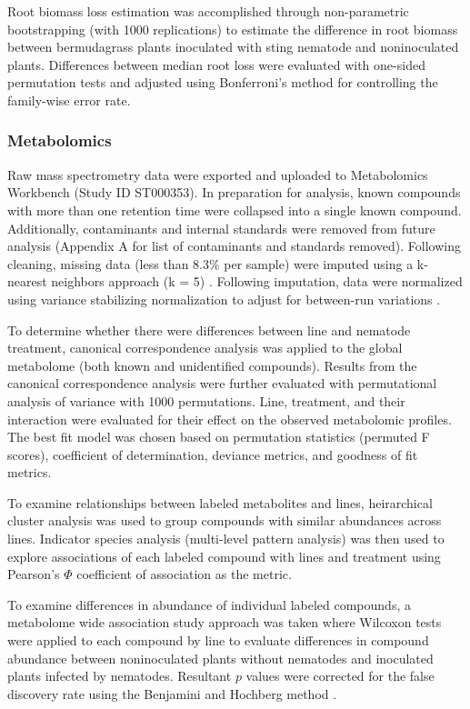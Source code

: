 \documentclass[9pt,lineno]{elife}
\begin{document}
Root biomass loss estimation was accomplished through non-parametric bootstrapping (with 1000 replications) to estimate the difference in root biomass between bermudagrass plants inoculated with sting nematode and noninoculated plants.  Differences between median root loss were evaluated with one-sided permutation tests and adjusted using Bonferroni's method for controlling the family-wise error rate.


\subsubsection{Metabolomics}

Raw mass spectrometry data were exported and uploaded to Metabolomics Workbench (Study ID ST000353).  In preparation for analysis, known compounds with more than one retention time were collapsed into a single known compound.  Additionally, contaminants and internal standards were removed from future analysis (Appendix A for list of contaminants and standards removed).  Following cleaning, missing data (less than 8.3\% per sample) were imputed using a k-nearest neighbors approach (k = 5) \citep{armitage2015missing}.  Following imputation, data were normalized using variance stabilizing normalization to adjust for between-run variations \citep{li2016performance}.  

To determine whether there were differences between line and nematode treatment, canonical correspondence analysis was applied to the global metabolome (both known and unidentified compounds).  Results from the canonical correspondence analysis were further evaluated with permutational analysis of variance with 1000 permutations. Line, treatment, and their interaction were evaluated for their effect on the observed metabolomic profiles.  The best fit model was chosen based on permutation statistics (permuted F scores), coefficient of determination, deviance metrics, and goodness of fit metrics.  

To examine relationships between labeled metabolites and lines, heirarchical cluster analysis was used to group compounds with similar abundances across lines.  Indicator species analysis (multi-level pattern analysis) was then used to explore associations of each labeled compound with lines and treatment using Pearson's $\Phi$ coefficient of association as the metric. 

To examine differences in abundance of individual labeled compounds, a metabolome wide association study approach was taken where Wilcoxon tests were applied to each compound by line to evaluate differences in compound abundance between noninoculated plants without nematodes and inoculated plants infected by nematodes.  Resultant $p$ values were corrected for the false discovery rate using the Benjamini and Hochberg method \citep{benjamini1995controlling}.  
\end{document}

